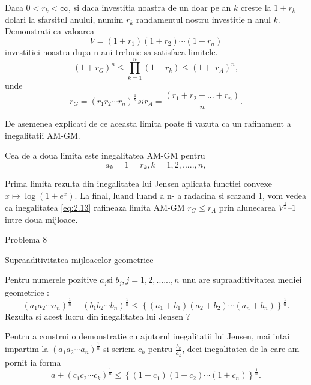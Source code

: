 \documentclass[a4paper,12pt,oneside]{report}
\begin{document}
Daca \(0< r_{k} < \infty\), si daca investitia noastra de un doar pe an \(k\) creste la \(1 +  r_{k}\) dolari la sfarsitul anului, numim \(r_{k}\) randamentul nostru investitie n anul \(k\). Demonstrati ca valoarea 
\begin{displaymath}
  V = \left ( 1 + r_{1} \right )\left ( 1 + r_{2} \right )\cdots \left ( 1 + r_{n} \right )
\end{displaymath} 
investitiei noastra dupa n ani trebuie sa satisfaca limitele. 
\begin{displaymath}
  \left ( 1 + r_{G} \right )^{n} \leq \prod_{k = 1}^{n} \left ( 1 + r_{k} \right )\leq \left ( 1 + |r_{A} \right )^{n}, \label{eq:2.13} \tag{2.13}
\end{displaymath}
unde 
\begin{displaymath}
  r_{G} = \left ( r_{1}r_{2} \cdots r_{n}\right )^{\frac{1}{n}} si r_{A} = \frac{\left ( r_{1} + r_{2} +  ...+ r_{n}\right )}{n} .
\end{displaymath}

De asemenea explicati de ce aceasta limita poate fi vazuta ca un rafinament a inegalitatii AM-GM. 

Cea de a doua limita este inegalitatea AM-GM pentru
\begin{displaymath}
  a_{k} = 1 = r_{k}, k =1,2,.....,n,
\end{displaymath} 

Prima limita rezulta din inegalitatea lui Jensen aplicata functiei convexe \(x \mapsto \log\left ( 1 + e^{x} \right ).\) 
La final, luand luand a n- a radacina si scazand 1, vom vedea ca inegalitatea \ref{eq:2.13} rafineaza limita AM-GM  \(r_{G} \leq r_{A}\) prin alunecarea \(V^{\frac{1}{n}} – 1\) intre doua mijloace. 


Problema 8

Supraaditivitatea mijloacelor geometrice
	
Pentru numerele pozitive \(a_{j} \)si \(b_{j}, j = 1 , 2, ......,n\) unu are supraaditivitatea mediei geometrice :
\begin{displaymath}
  \left ( a_{1}a_{2}\cdots a_{n} \right )^{\frac{1}{n}} + \left ( b_{1}b_{2}\cdots b_{n} \right )^{\frac{1}{n}} \leq  \left \{ \left ( a_{1} + b_{1}\right ) \left ( a_{2} + b_{2} \right )\cdots \left ( a_{n} + b_{n} \right )\right \}^{\frac{1}{n}}. 
\end{displaymath}
	Rezulta si acest lucru din inegalitatea lui Jensen ?
	
	Pentru a construi o demonstratie cu ajutorul inegalitatii lui Jensen, mai intai impartim la 
\(\left ( a_{1}a_{2}\cdots a_{n} \right )^{\frac{1}{n}}\) si scriem \(c_{k}\) pentru \(\frac{b_{k}}{a_{k}}\), deci inegalitatea de la care am pornit ia forma 
\begin{displaymath}
  a + \left ( c_{1}c_{2} \cdots c_{k}\right )^{\frac{1}{n}}\leq \left \{ \left ( 1 + c_{1} \right )\left ( 1 + c_{2} \right )\cdots \left ( 1 + c_{n} \right ) \right \}^{\frac{1}{n}}. 
\end{displaymath}
\end{document}
